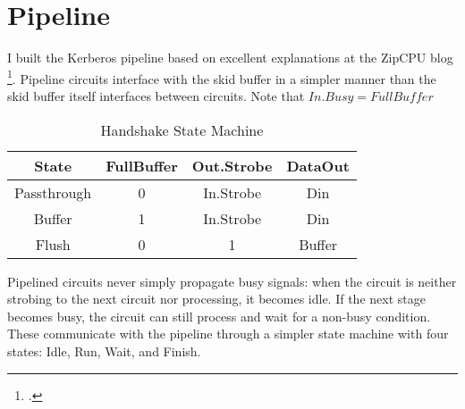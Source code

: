 \section{Pipeline}

I built the Kerberos pipeline based on excellent explanations at the ZipCPU blog \footcite{ZipCPU.Pipeline}.  Pipeline circuits interface with the skid buffer in a simpler manner than the skid buffer itself interfaces between circuits.  Note that $In.Busy = FullBuffer$

\begin{table}[ht]
    \caption{Handshake State Machine} %
    \centering %
    \begin{tabular}{c c c c} %
        \hline\hline
        State & FullBuffer & Out.Strobe & DataOut \\ [0.5ex] %

        \hline
        Passthrough & 0 & In.Strobe & Din \\
        Buffer & 1 & In.Strobe & Din \\
        Flush & 0 & 1 & Buffer \\ [1ex]
        \hline
    \end{tabular}
    \label{table:pipeline-handshake-circuit-state}
\end{table}

\begin{center}
\end{center}


Pipelined circuits never simply propagate busy signals:  when the circuit is neither strobing to the next circuit nor processing, it becomes idle.  If the next stage becomes busy, the circuit can still process and wait for a non-busy condition.  These communicate with the pipeline through a simpler state machine with four states:  Idle, Run, Wait, and Finish.

